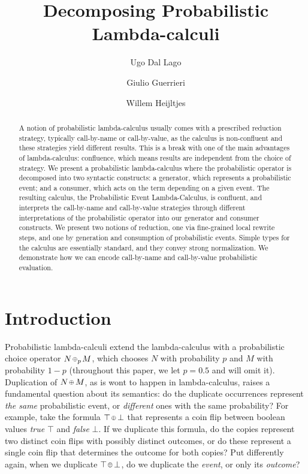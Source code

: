 \documentclass[runningheads]{llncs}
\title{Decomposing Probabilistic Lambda-calculi}
\author{
	 Ugo Dal Lago\inst1
\and Giulio Guerrieri\inst2
\and Willem Heijltjes\inst2
}
\institute{%
Dipartimento di Informatica - Scienza e Ingegneria\\ Universit\`a di Bologna, Bologna, Italy\\
\email{ugo.dallago@unibo.it}\\[10pt]
\and%
Department of Computer Science\\ University of Bath, Bath, UK\\
\email{\{w.b.heijltjes,g.guerrieri\}@bath.ac.uk}
}
\theoremstyle{definition}
\theoremstyle{plain}
\newcommand\+[1][{}]{\kern1pt{\smallbin\oplus}_{#1}\kern1pt}
\begin{document}
\maketitle

\begin{abstract}
A notion of probabilistic lambda-calculus usually comes with a prescribed reduction strategy, typically call-by-name or call-by-value, as the calculus is non-confluent and these strategies yield different results. This is a break with one of the main advantages of lambda-calculus: confluence, which means results are independent from the choice of strategy.
We present a probabilistic lambda-calculus where the probabilistic operator is decomposed into two syntactic constructs: a generator, which represents a probabilistic event; and a consumer, which acts on the term depending on a given event. The resulting calculus, the Probabilistic Event Lambda-Calculus, is confluent, and interprets the call-by-name and call-by-value strategies through different interpretations of the probabilistic operator into our generator and consumer constructs.
We present two notions of reduction, one via fine-grained local rewrite steps, and one by generation and consumption of probabilistic events. Simple types for the calculus are essentially standard, and they convey strong normalization. We demonstrate how we can encode call-by-name and call-by-value probabilistic evaluation.
\end{abstract}

\section{Introduction}

Probabilistic lambda-calculi \cite{SahebDjahromi78,Manber-Tompa-1982,JonesPlotkin89,deLiguoroPiperno95,JungTix98,DalLagoZorzi12,FaggianRonchi19} extend the lambda-calculus with a probabilistic choice operator $N\+[p]M$, which chooses $N$ with probability $p$ and $M$ with probability $1-p$ (throughout this paper, we let $p=0.5$ and will omit it). Duplication of $N\+M$, as is wont to happen in lambda-calculus, raises a fundamental question about its semantics: do the duplicate occurrences represent \emph{the same} probabilistic event, or \emph{different} ones with the same probability? For example, take the formula $\top\+\bot$ that represents a coin flip between boolean values \emph{true} $\top$ and \emph{false} $\bot$. If we duplicate this formula, do the copies represent two distinct coin flips with possibly distinct outcomes, or do these represent a single coin flip that determines the outcome for both copies? Put differently again, when we duplicate $\top\+\bot$, do we duplicate the \emph{event}, or only its \emph{outcome}?
\end{document}
